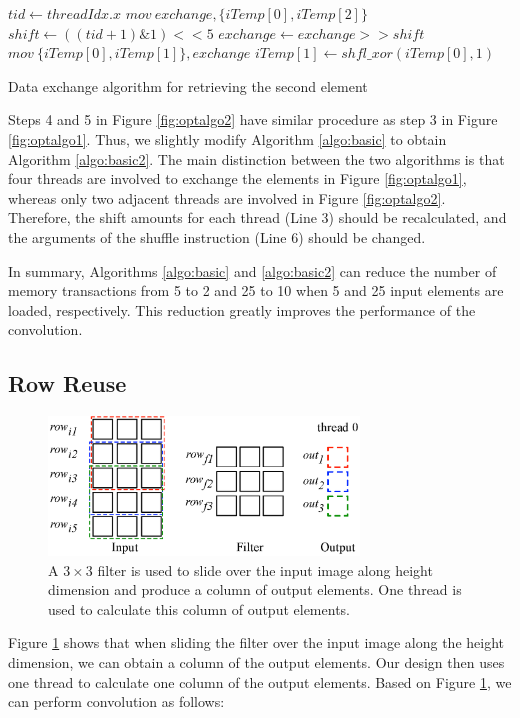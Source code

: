 \begin{algorithm}[t!]
	$tid \gets threadIdx.x$\;
	$mov\ exchange, \{iTemp[0], iTemp[2]\}$\;
	$shift \gets ((tid+1)\&1)<<5$\;
	$exchange \gets exchange >> shift$\;
	$mov\ \{iTemp[0],iTemp[1]\}, exchange$\;
	$iTemp[1] \gets shfl\_xor(iTemp[0],1)$\;	
	\caption{Data exchange algorithm for retrieving the second element}
	\label{algo:basic2}
\end{algorithm}

Steps 4 and 5 in Figure \ref{fig:optalgo2} have similar procedure as step 3 in Figure \ref{fig:optalgo1}. Thus, we slightly modify
Algorithm \ref{algo:basic} to obtain Algorithm \ref{algo:basic2}. The main distinction between the two algorithms is that four threads are involved to exchange the
elements in Figure \ref{fig:optalgo1}, whereas only two adjacent threads are involved in Figure \ref{fig:optalgo2}. Therefore, the shift amounts for each thread (Line 3) should be recalculated, and the arguments of the shuffle instruction (Line 6) should be changed.

In summary, Algorithms \ref{algo:basic} and \ref{algo:basic2} can reduce the number of memory transactions from 5 to 2 and 25 to 10 when 5 and 25 input elements are loaded, respectively. This reduction greatly improves the performance of the convolution.

\subsection{Row Reuse}
\label{sec:rowreuse}
\begin{figure}
	\centering
	\includegraphics[width=\columnwidth,height=3.7cm]{./figure/rowreuse.eps}
\caption{A $3 \times 3$ filter is used to slide over the input image along height dimension and produce a column of output elements. One thread is used to calculate this column of output elements.}
\label{fig:rowreuse}
\end{figure}

Figure \ref{fig:rowreuse} shows that when sliding the filter over the input image along the height dimension, we can obtain a column of the output elements. Our design then uses one thread to calculate one column of the output elements. Based on Figure \ref{fig:rowreuse},
we can perform convolution as follows:

